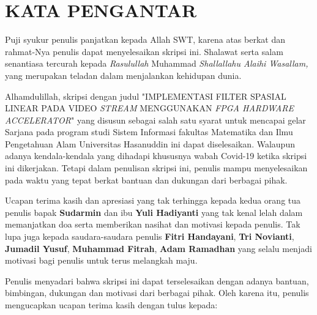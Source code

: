 \chapter*{KATA PENGANTAR}

Puji syukur penulis panjatkan kepada Allah SWT, karena atas berkat dan rahmat-Nya penulis dapat menyelesaikan skripsi ini. Shalawat serta salam senantiasa tercurah kepada \textit{Rasulullah} Muhammad \textit{Shallallahu Alaihi Wasallam,} yang merupakan teladan dalam menjalankan kehidupan dunia.

Alhamdulillah, skripsi dengan judul "IMPLEMENTASI FILTER SPASIAL LINEAR PADA VIDEO \textit{STREAM} MENGGUNAKAN \textit{FPGA HARDWARE ACCELERATOR}" yang disusun sebagai salah satu syarat untuk mencapai gelar Sarjana pada program studi Sistem Informasi fakultas Matematika dan Ilmu Pengetahuan Alam Universitas Hasanuddin ini dapat diselesaikan. Walaupun adanya kendala-kendala yang dihadapi khususnya wabah Covid-19 ketika skripsi ini dikerjakan. Tetapi dalam penulisan skripsi ini, penulis mampu menyelesaikan pada waktu yang tepat berkat bantuan dan dukungan dari berbagai pihak. 

Ucapan terima kasih dan apresiasi yang tak terhingga kepada kedua orang tua penulis bapak \textbf{Sudarmin} dan ibu \textbf{Yuli Hadiyanti} yang tak kenal lelah dalam memanjatkan doa serta memberikan nasihat dan motivasi kepada penulis. Tak lupa juga kepada saudara-saudara penulis \textbf{Fitri Handayani}, \textbf{Tri Novianti}, \textbf{Jumadil Yusuf}, \textbf{Muhammad Fitrah}, \textbf{Adam Ramadhan} yang selalu menjadi motivasi bagi penulis untuk terus melangkah maju.

Penulis menyadari bahwa skripsi ini dapat terselesaikan dengan adanya bantuan, bimbingan, dukungan dan motivasi dari berbagai pihak. Oleh karena itu, penulis mengucapkan ucapan terima kasih dengan tulus kepada:

